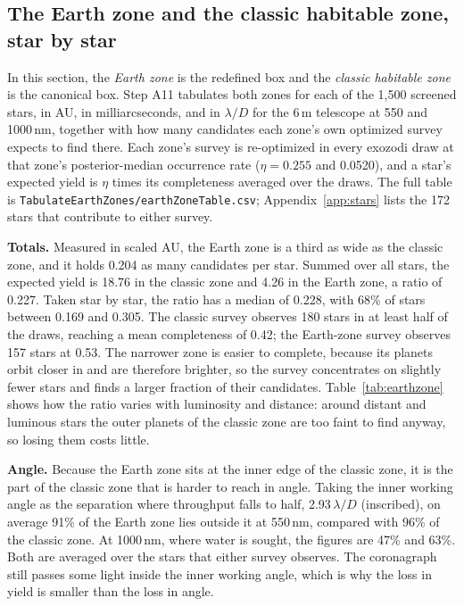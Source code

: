 \documentclass[11pt,a4paper]{article}
\begin{document}
\subsection{The Earth zone and the classic habitable zone, star by star}
\label{sec:earthzone}

In this section, the \emph{Earth zone} is the redefined box and the \emph{classic habitable zone}
is the canonical box. Step A11 tabulates both zones for each of the 1,500 screened stars, in
AU, in milliarcseconds, and in $\lambda/D$ for the 6\,m telescope at 550 and 1000\,nm, together
with how many candidates each zone's own optimized survey expects to find there. Each zone's survey
is re-optimized in every exozodi draw at that zone's posterior-median occurrence rate
($\eta = 0.255$ and 0.0520), and a star's expected yield is $\eta$ times its completeness
averaged over the draws. The full table is \texttt{TabulateEarthZones/earthZoneTable.csv};
Appendix~\ref{app:stars} lists the 172 stars that contribute to either survey.

\textbf{Totals.} Measured in scaled AU, the Earth zone is a third as wide as the classic zone, and
it holds 0.204 as many candidates per star. Summed over all stars, the expected yield is
18.76 in the classic zone and 4.26 in the Earth zone, a ratio of
0.227. Taken star by star, the ratio has a median of 0.228, with 68\% of stars
between 0.169 and 0.305. The classic survey observes 180 stars in
at least half of the draws, reaching a mean completeness of 0.42; the Earth-zone survey
observes 157 stars at 0.53. The narrower zone is easier to complete, because its
planets orbit closer in and are therefore brighter, so the survey concentrates on slightly fewer
stars and finds a larger fraction of their candidates. Table~\ref{tab:earthzone} shows how the
ratio varies with luminosity and distance: around distant and luminous stars the outer planets of
the classic zone are too faint to find anyway, so losing them costs little.

\textbf{Angle.} Because the Earth zone sits at the inner edge of the classic zone, it is the part
of the classic zone that is harder to reach in angle. Taking the inner working angle as the
separation where throughput falls to half, 2.93\,$\lambda/D$ (inscribed), on average
91\% of the Earth zone lies outside it at 550\,nm, compared with
96\% of the classic zone. At 1000\,nm, where water is sought, the figures are
47\% and 63\%. Both are averaged over the stars that either survey
observes. The coronagraph still passes some light inside the inner working angle, which is why the
loss in yield is smaller than the loss in angle.
\end{document}
